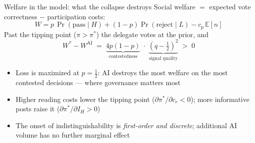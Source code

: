 \documentclass[11pt,aspectratio=169]{beamer}
\newenvironment{wideitemize}{\begin{itemize}\setlength{\itemsep}{0.7em}}{\end{itemize}}
\begin{document}
\begin{frame}{Welfare in the model: what the collapse destroys}
  Social welfare $=$ expected vote correctness $-$ participation costs:
  \[
    W = p\,\Pr(\text{pass} \mid H) + (1-p)\Pr(\text{reject} \mid L) - c_p\,\mathbb{E}[n]
  \]
  Past the tipping point ($\pi > \pi^*$) the delegate votes at the prior, and
  \[
    W^{*} - W^{\text{AI}} \;=\;
    \underbrace{4p(1-p)}_{\text{contestedness}} \;\cdot\;
    \underbrace{\left(q - \tfrac12\right)^2}_{\text{signal quality}} \;>\; 0
  \]
  \begin{wideitemize}
    \item Loss is maximized at $p = \tfrac12$: \alert{AI destroys the most welfare on
      the most contested decisions} --- where governance matters most
    \item Higher reading costs lower the tipping point
      ($\partial\pi^*/\partial c_r < 0$); more informative posts raise it
      ($\partial\pi^*/\partial I_H > 0$)
    \item The onset of indistinguishability is \emph{first-order and discrete};
      additional AI volume has no further marginal effect
  \end{wideitemize}
\end{frame}
\end{document}
